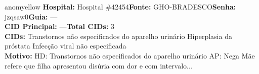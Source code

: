 \documentclass[a4paper,10pt]{article}
\begin{document}
\begin{anomalycard}[Interna\c{c}\~{a}o \#118666 | Pac. \#98446 | MODERADO (z=2.72) | LOS: 5d | 25/02/2026\,$\to$\,02/03/2026]{anomyellow}
\textbf{Hospital:} Hospital \#42454\quad \textbf{Fonte:} GHO-BRADESCO\quad \textbf{Senha:} jzqsaw0\quad \textbf{Guia:} ---\\

\textbf{CID Principal:} {\small ---}\quad\textbf{Total CIDs:} 3\\

\textbf{CIDs:} {\scriptsize Transtornos não especificados do aparelho urinário \textbar{} Hiperplasia da próstata \textbar{} Infecção viral não especificada}\\

\textbf{Motivo:} {\scriptsize HD: Transtornos não especificados do aparelho urinário  AP: Nega Mãe refere que filha apresentou disúria com dor e com intervalo...}\\



\end{anomalycard}
\end{document}
